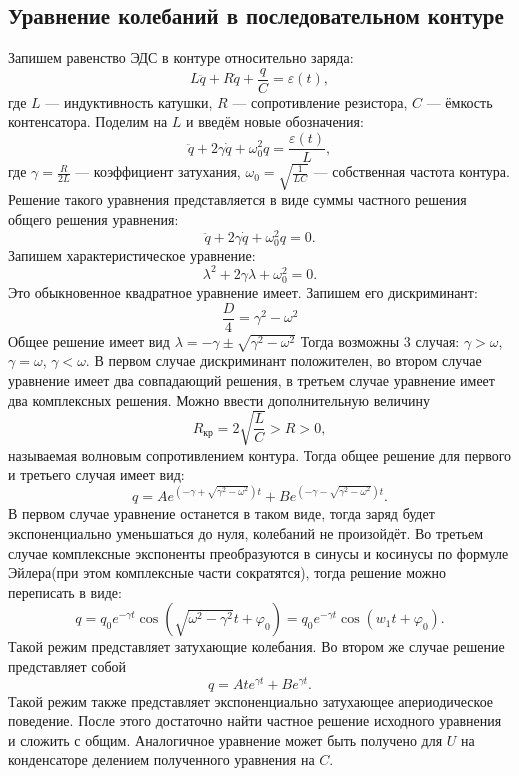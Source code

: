 \documentclass[12pt]{article}
\begin{document}
\subsection*{Уравнение колебаний в последовательном контуре}
Запишем равенство ЭДС в контуре относительно заряда:
\begin{equation}
	L\ddot{q} + R \dot{q} + \frac{q}{C} = \varepsilon(t),
\end{equation}
где $L$ --- индуктивность катушки, $R$ --- сопротивление резистора, $C$ --- ёмкость контенсатора. 
Поделим на $L$ и введём новые обозначения: 
\[
	\ddot{q} + 2\gamma \dot{q} + \omega_0^2 q = \frac{\varepsilon(t)}{L}, 
\]
где $\gamma = \frac{R}{2L}$ --- коэффициент затухания, $\omega_0 = \sqrt{\frac{1}{LC}}$ --- собственная частота контура. 
Решение такого уравнения представляется в виде суммы частного решения общего решения уравнения: 
\[
	\ddot{q} + 2\gamma \dot{q} + \omega_0^2 q = 0.
\]
Запишем характеристическое уравнение:
\[
	\lambda^2 + 2\gamma \lambda + \omega_0^2 = 0.
\]
Это обыкновенное квадратное уравнение имеет. Запишем его дискриминант: 
\[
	\frac{D}{4} = \gamma^2 - \omega^2
\]
Общее решение имеет вид $\lambda = -\gamma \pm \sqrt{\gamma^2 - \omega^2}$ 
Тогда возможны 3 случая: $\gamma > \omega$, $\gamma = \omega$, $\gamma < \omega$. 
В первом случае дискриминант положителен, во втором случае уравнение имеет два совпадающий решения, 
в третьем случае уравнение имеет два комплексных решения. Можно ввести дополнительную величину
\begin{equation}
	R_{\text{кр}} = 2\sqrt{\frac{L}{C}} > R > 0,  
\end{equation} 
называемая волновым сопротивлением контура.
Тогда общее решение для первого и третьего случая имеет вид: 
\begin{equation}
	q = Ae^{\left( -\gamma + \sqrt{\gamma^2 - \omega^2} \right) t } + Be^{\left( -\gamma - \sqrt{\gamma^2 - \omega^2} \right) t }.  
\end{equation} 
В первом случае уравнение останется в таком виде, тогда заряд будет экспоненциально уменьшаться до нуля, 
колебаний не произойдёт. 
Во третьем случае комплексные экспоненты преобразуются в синусы и косинусы по формуле Эйлера(при этом 
комплексные части сократятся), тогда 
решение можно переписать в виде: 
\begin{equation}
	q = q_0 e^{-\gamma t} \cos(\sqrt{\omega^2 - \gamma^2}t + \varphi_0) = q_0 e^{-\gamma t} \cos(w_1 t + \varphi_0).
\end{equation}
Такой режим представляет затухающие колебания. 
Во втором же случае решение представляет собой 
\begin{equation}
	q = A t e^{\gamma t} + B e^{\gamma t}.
\end{equation}
Такой режим также представляет экспоненциально затухающее апериодическое поведение.
После этого достаточно найти частное решение исходного уравнения и сложить с общим. Аналогичное уравнение может 
быть получено для $U$ на конденсаторе делением полученного уравнения на $C$.  
\end{document}
